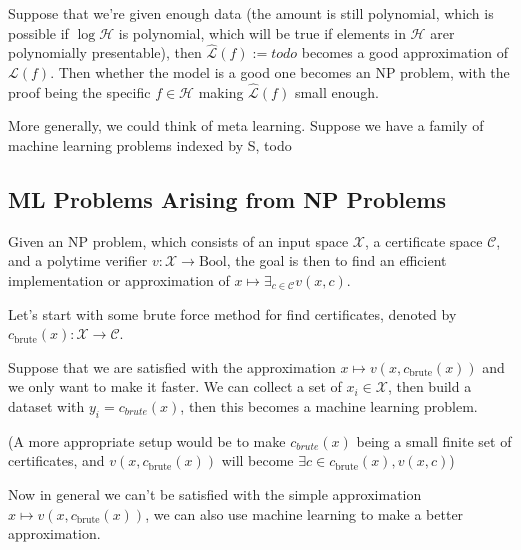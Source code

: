 \documentclass[../main.tex]{subfiles}
\begin{document}
Suppose that we're given enough data (the amount is still polynomial, which is possible if $\log \mathcal{H}$ is polynomial, which will be true if elements in $\mathcal{H}$ arer polynomially presentable), then $\widehat{\mathscr{L}}(f):=todo$ becomes a good approximation of $\mathscr{L}(f)$. Then whether the model is a good one becomes an NP problem, with the proof being the specific $f\in \mathcal{H}$ making $\widehat{\mathscr{L}}(f)$ small enough.

More generally, we could think of meta learning. Suppose we have a family of machine learning problems indexed by S, todo
\subsection{ML Problems Arising from NP Problems}
\begin{center}
\end{center}

Given an NP problem, which consists of an input space $\mathcal{X}$, a certificate space $\mathcal{C}$, and a polytime verifier $v: \mathcal{X} \rightarrow \text{Bool}$, the goal is then to find an efficient implementation or approximation of $x\mapsto \exists_{c\in \mathcal{C}} v(x,c)$.

Let's start with some brute force method for find certificates, denoted by $c_{\text{brute}}(x): \mathcal{X} \to \mathcal{C}$.

Suppose that we are satisfied with the approximation $x\mapsto v(x,c_{\text{brute}}(x))$ and we only want to make it faster. We can collect a set of $x_i\in \mathcal{X}$, then build a dataset with $y_i=c_{brute}(x)$, then this becomes a machine learning problem.

(A more appropriate setup would be to make $c_{brute}(x)$ being a small finite set of certificates, and $v(x,c_{\text{brute}}(x))$ will become $\exists c\in c_{\text{brute}}(x), v(x, c)$)

Now in general we can't be satisfied with the simple approximation $x\mapsto v(x,c_{\text{brute}}(x))$, we can also use machine learning to make a better approximation.
\end{document}
